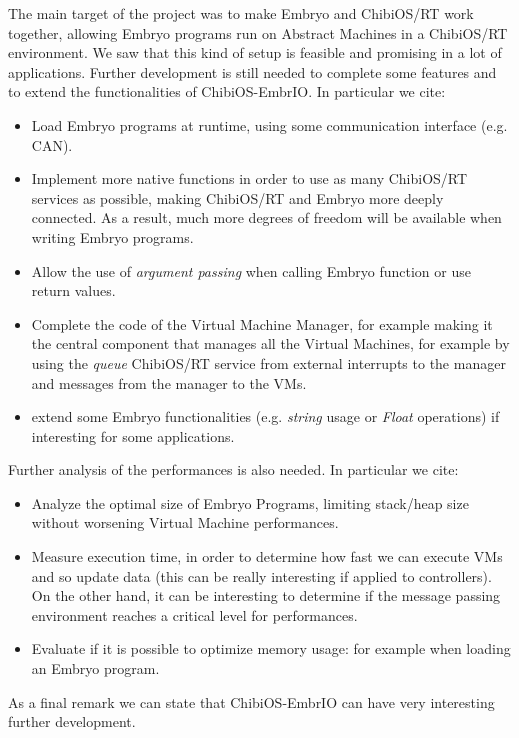 \documentclass[a4paper,10pt]{article}
\begin{document}
\begin{multicols}{2}
The main target of the project was to make Embryo and ChibiOS/RT work together, allowing Embryo programs run on Abstract Machines in a ChibiOS/RT environment. We saw that this kind of setup is feasible and promising in a lot of applications.\newline
Further development is still needed to complete some features and to extend the functionalities of ChibiOS-EmbrIO. In particular we cite:

\begin{itemize}
\item Load Embryo programs at runtime, using some communication interface (e.g. CAN).
\item Implement more native functions in order to use as many ChibiOS/RT services as possible, making ChibiOS/RT and Embryo more deeply connected. As a result, much more degrees of freedom will be available when writing Embryo programs.
\item Allow the use of \textit{argument passing} when calling Embryo function or use return values.
\item Complete the code of the Virtual Machine Manager, for example making it the central component that manages all the Virtual Machines, for example by using the \textit{queue} ChibiOS/RT service from external interrupts to the manager and messages from the manager to the VMs.
\item extend some Embryo functionalities (e.g. \textit{string} usage or \textit{Float} operations) if interesting for some applications.
\end{itemize}

Further analysis of the performances is also needed. In particular we cite:

\begin{itemize}
\item Analyze the optimal size of Embryo Programs, limiting stack/heap size without worsening Virtual Machine performances.
\item Measure execution time, in order to determine how fast we can execute VMs and so update data (this can be really interesting if applied to controllers). On the other hand, it can be interesting to determine if the message passing environment reaches a critical level for performances.
\item Evaluate if it is possible to optimize memory usage: for example when loading an Embryo program.
\end{itemize}

As a final remark we can state that ChibiOS-EmbrIO can have very interesting further development.


\end{multicols}
\end{document}
